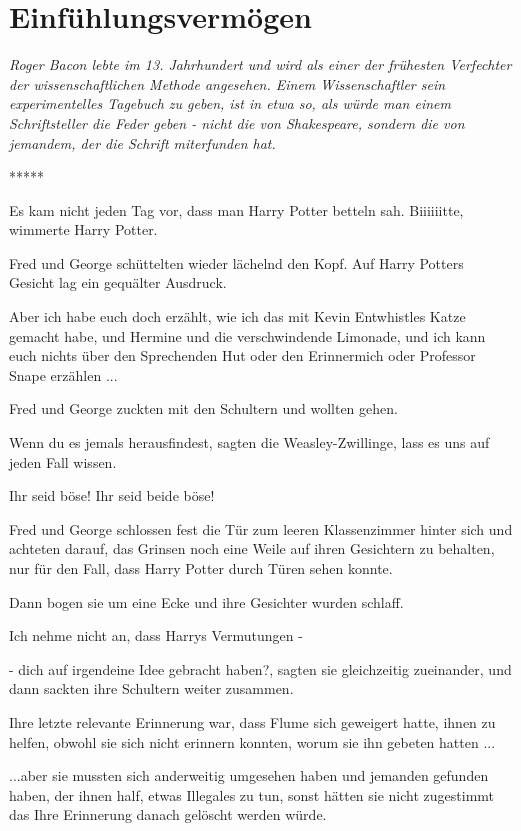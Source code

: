 \chapter{Einfühlungsvermögen}

\emph{Roger Bacon lebte im 13. Jahrhundert und wird als einer der frühesten
Verfechter der wissenschaftlichen Methode angesehen. Einem Wissenschaftler sein
experimentelles Tagebuch zu geben, ist in etwa so, als würde man einem
Schriftsteller die Feder geben - nicht die von Shakespeare, sondern die von
jemandem, der die Schrift miterfunden hat.}

\begin{center}*****\end{center}

Es kam nicht jeden Tag vor, dass man Harry Potter betteln sah. \glqq{}
Biiiiiitte\grqq{}, wimmerte Harry Potter.

Fred und George schüttelten wieder lächelnd den Kopf. Auf Harry Potters Gesicht
lag ein gequälter Ausdruck.

\glqq{}Aber ich habe euch doch erzählt, wie ich das mit Kevin Entwhistles Katze
gemacht habe, und Hermine und die verschwindende Limonade, und ich kann euch
nichts über den Sprechenden Hut oder den Erinnermich oder Professor Snape
erzählen ...\grqq{}

Fred und George zuckten mit den Schultern und wollten gehen.

\glqq{}Wenn du es jemals herausfindest\grqq{}, sagten die Weasley-Zwillinge,
\glqq{}lass es uns auf jeden Fall wissen.\grqq{}

\glqq{}Ihr seid böse! Ihr seid beide böse!\grqq{}

Fred und George schlossen fest die Tür zum leeren Klassenzimmer hinter sich und
achteten darauf, das Grinsen noch eine Weile auf ihren Gesichtern zu behalten,
nur für den Fall, dass Harry Potter durch Türen sehen konnte.

Dann bogen sie um eine Ecke und ihre Gesichter wurden schlaff.

\glqq{}Ich nehme nicht an, dass Harrys Vermutungen -\grqq{}

\glqq{}- dich auf irgendeine Idee gebracht haben?\grqq{}, sagten sie
gleichzeitig zueinander, und dann sackten ihre Schultern weiter zusammen.

Ihre letzte relevante Erinnerung war, dass Flume sich geweigert hatte, ihnen zu
helfen, obwohl sie sich nicht erinnern konnten, worum sie ihn gebeten hatten ...

...aber sie mussten sich anderweitig umgesehen haben und jemanden gefunden
haben, der ihnen half, etwas Illegales zu tun, sonst hätten sie nicht zugestimmt
das Ihre Erinnerung danach gelöscht werden würde.

